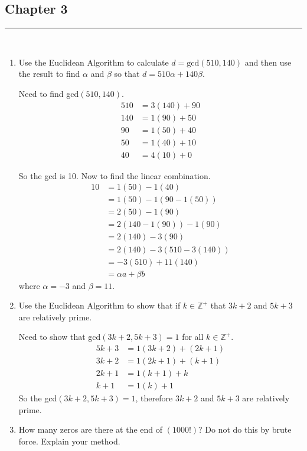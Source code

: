 \documentclass[class=article, crop=false]{standalone}
\def\integers{{\mathbb Z}}
\begin{document}
\subsection{Chapter 3}
\rule{\textwidth}{1pt}\\
\begin{enumerate}
\item
 Use the Euclidean Algorithm to calculate $d=\mbox{gcd}(510,140)$
  and then use the result to find $\alpha$ and $\beta$ so
  that $d=510\alpha+140\beta$.\hfill{}

  Need to find gcd$(510,140)$.
  \begin{align*}
	510 &= 3(140) + 90 \\
	140 &= 1(90) + 50 \\
	90 &= 1(50) + 40 \\
	50 &= 1(40) + 10 \\
	40 &= 4(10) + 0
  \end{align*}

  So the gcd is 10. Now to find the linear combination.
  \begin{align*}
	10 &= 1(50) - 1(40) \\
	&= 1(50) - 1(90-1(50)) \\
	&= 2(50) - 1(90) \\
	&= 2(140-1(90)) - 1(90) \\
	&= 2(140) -3(90) \\
	&= 2(140) -3(510-3(140)) \\
	&= -3(510) +11(140) \\
	&= \alpha a+ \beta b
  \end{align*}
  where $\alpha = -3$ and $\beta = 11$.

\item
  Use the Euclidean Algorithm to show that if $k\in\integers^+$ that
  $3k+2$ and $5k+3$ are relatively prime.\hfill{}

  Need to show that gcd$(3k+2, 5k+3)=1$ for all $k\in\integers^+$.
  \begin{align*}
	5k+3 &= 1(3k+2) + (2k+1) \\
	3k+2 &= 1(2k+1) + (k+1) \\
	2k+1 &= 1(k+1) + k \\
	k+1 &= 1(k) + 1
  \end{align*}
  So the gcd$(3k+2,5k+3)=1$, therefore $3k+2$ and $5k+3$ are relatively prime.

\item
  How many zeros are there at the end of $(1000!)$?  Do not do this
  by brute force.  Explain your method.\hfill{}


\end{enumerate}
\end{document}

